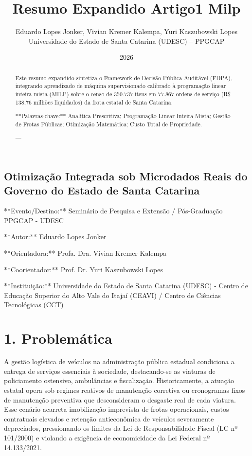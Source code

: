 \documentclass[10pt,a4paper,journal]{article}
\title{Resumo Expandido Artigo1 Milp}
\author{Eduardo Lopes Jonker, Vivian Kremer Kalempa, Yuri Kaszubowski Lopes\\ \small Universidade do Estado de Santa Catarina (UDESC) -- PPGCAP}
\date{2026}
\begin{document}
\maketitle

\subsection{Otimização Integrada sob Microdados Reais do Governo do Estado de Santa Catarina}
**Evento/Destino:** Seminário de Pesquisa e Extensão / Pós-Graduação PPGCAP - UDESC

**Autor:** Eduardo Lopes Jonker

**Orientadora:** Profa. Dra. Vivian Kremer Kalempa

**Coorientador:** Prof. Dr. Yuri Kaszubowski Lopes

**Instituição:** Universidade do Estado de Santa Catarina (UDESC) - Centro de Educação Superior do Alto Vale do Itajaí (CEAVI) / Centro de Ciências Tecnológicas (CCT)

\begin{abstract}
Este resumo expandido sintetiza o Framework de Decisão Pública Auditável (FDPA), integrando aprendizado de máquina supervisionado calibrado à programação linear inteira mista (MILP) sobre o censo de 350.737 itens em 77.867 ordens de serviço (R\$ 138,76 milhões liquidados) da frota estatal de Santa Catarina.

**Palavras-chave:** Analítica Prescritiva; Programação Linear Inteira Mista; Gestão de Frotas Públicas; Otimização Matemática; Custo Total de Propriedade.

---

\end{abstract}

\section{1. Problemática}
A gestão logística de veículos na administração pública estadual condiciona a entrega de serviços essenciais à sociedade, destacando-se as viaturas de policiamento ostensivo, ambulâncias e fiscalização. Historicamente, a atuação estatal opera sob regimes reativos de manutenção corretiva ou cronogramas fixos de manutenção preventiva que desconsideram o desgaste real de cada viatura. Esse cenário acarreta imobilização imprevista de frotas operacionais, custos contratuais elevados e retenção antieconômica de veículos severamente depreciados, pressionando os limites da Lei de Responsabilidade Fiscal (LC nº 101/2000) e violando a exigência de economicidade da Lei Federal nº 14.133/2021.
\end{document}
